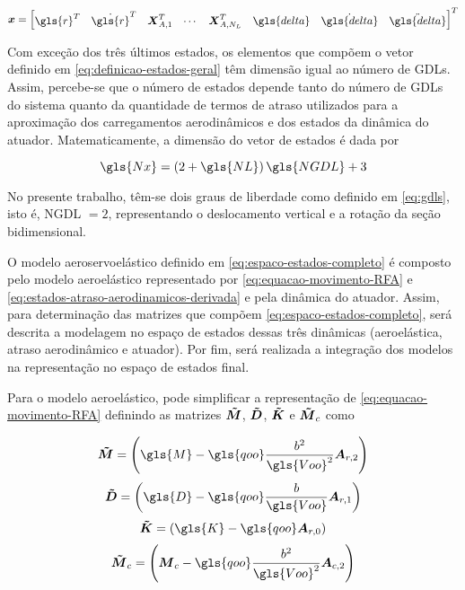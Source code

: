 \begin{equation}\label{eq:definicao-estados-geral}
    \boldsymbol{x} = \begin{bmatrix} \gls{r}^{T} & \dot{\gls{r}}^{T} & \boldsymbol{X}_{A,1}^{T} & \cdots & \boldsymbol{X}_{A,N_L}^{T} & \gls{delta} & \dot{\gls{delta}} & \ddot{\gls{delta}} \end{bmatrix}^{T}
\end{equation}

Com exceção dos três últimos estados, os elementos que compõem o vetor definido em \eqref{eq:definicao-estados-geral} têm dimensão igual ao número de \gls{GDL}s. Assim, percebe-se que o número de estados depende tanto do número de \gls{GDL}s do sistema quanto da quantidade de termos de atraso utilizados para a aproximação dos carregamentos aerodinâmicos e dos estados da dinâmica do atuador. Matematicamente, a dimensão do vetor de estados é dada por

\begin{equation}\label{Eq_NoEstados}
    \gls{Nx} = \left( 2  + \gls{NL} \right)\gls{NGDL} + 3
\end{equation}

No presente trabalho, têm-se dois graus de liberdade como definido em \eqref{eq:gdls}, isto é, \gls{NGDL} $=2$, representando o deslocamento vertical e a rotação da seção bidimensional.

O modelo aeroservoelástico definido em \eqref{eq:espaco-estados-completo} é composto pelo modelo aeroelástico representado por \eqref{eq:equacao-movimento-RFA} e \eqref{eq:estados-atraso-aerodinamicos-derivada} e pela dinâmica do atuador. Assim, para determinação das matrizes que compõem \eqref{eq:espaco-estados-completo}, será descrita a modelagem no espaço de estados dessas três dinâmicas (aeroelástica, atraso aerodinâmico e atuador). Por fim, será realizada a integração dos modelos na representação no espaço de estados final.

Para o modelo aeroelástico, pode simplificar a representação de \eqref{eq:equacao-movimento-RFA} definindo as matrizes $\boldsymbol{\Tilde{M}}$, $\boldsymbol{\Tilde{D}}$, $\boldsymbol{\Tilde{K}}$ e $\boldsymbol{\Tilde{M}}_{c}$ como

\begin{equation}\label{Eq_MatrizesSimplificacao1}
    \boldsymbol{\Tilde{M}} = \left(\gls{M} - \gls{qoo}\frac{b^2}{\gls{Voo}^2}\boldsymbol{A}_{r,2}\right)
\end{equation}
\begin{equation}\label{Eq_MatrizesSimplificacao2}
    \boldsymbol{\Tilde{D}} = \left(\gls{D} - \gls{qoo}\frac{b}{\gls{Voo}}\boldsymbol{A}_{r,1}\right)
\end{equation}
\begin{equation}\label{Eq_MatrizesSimplificacao3}
    \boldsymbol{\Tilde{K}} = \left(\gls{K} - \gls{qoo}\boldsymbol{A}_{r,0}\right)
\end{equation}
\begin{equation}\label{Eq_MatrizesSimplificacao4}
    \boldsymbol{\Tilde{M}}_{c} = \left(\boldsymbol{M}_{c} - \gls{qoo}\frac{b^2}{\gls{Voo}^2}\boldsymbol{A}_{c,2}\right)
\end{equation}

